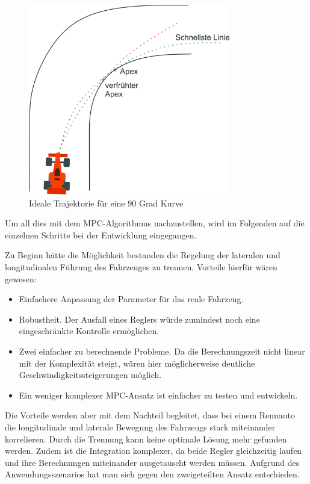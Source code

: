 \documentclass{like}
\begin{document}
\begin{figure}[ht!]
	\centering
	\includegraphics[width=250pt]{Abbildungen/apexTrajektory.png}
	\caption{Ideale Trajektorie für eine 90 Grad Kurve}
	\label{fig:idealTrajektorie}
\end{figure}


Um all dies mit dem \ac{MPC}-Algorithmus nachzustellen, wird im Folgenden auf die einzelnen Schritte bei der Entwicklung eingegangen.

Zu Beginn hätte die Möglichkeit bestanden die Regelung der lateralen und longitudinalen Führung des Fahrzeuges zu trennen. 
Vorteile hierfür wären gewesen:
\begin{itemize}
	\item Einfachere Anpassung der Parameter für das reale Fahrzeug.
	\item Robustheit. Der Ausfall eines Reglers würde zumindest noch eine eingeschränkte Kontrolle ermöglichen.
	\item Zwei einfacher zu berechnende Probleme. Da die Berechnungszeit nicht linear mit der Komplexität steigt, wären hier möglicherweise deutliche Geschwindigkeitssteigerungen möglich.
	\item Ein weniger komplexer \ac{MPC}-Ansatz ist einfacher zu testen und entwickeln.
\end{itemize}

Die Vorteile werden aber mit dem Nachteil begleitet, dass bei einem Rennauto die longitudinale und laterale Bewegung des Fahrzeugs stark miteinander korrelieren. Durch die Trennung kann keine optimale Lösung mehr gefunden werden. 
Zudem ist die Integration komplexer, da beide Regler gleichzeitig laufen und ihre Berechnungen miteinander ausgetauscht werden müssen.
Aufgrund des Anwendungsszenarios hat man sich gegen den zweigeteilten Ansatz entschieden.
\end{document}
